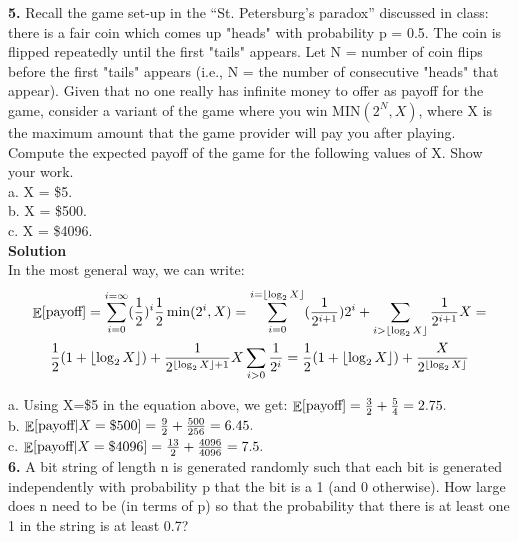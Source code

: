 \documentclass[10pt,a4paper,oneside,draft]{report}
\DeclareMathOperator{\EX}{\mathbb{E}}%
\DeclarePairedDelimiter\floor{\lfloor}{\rfloor}
\begin{document}
	
\textbf{5.} Recall the game set-up in the “St. Petersburg’s paradox” discussed in class: there is a fair coin which comes up "heads" with probability p = 0.5. The coin is flipped repeatedly until the first "tails" appears. Let N = number of coin flips before the first "tails" appears (i.e., N = the number of consecutive "heads" that appear). Given that no one really has infinite money to offer as payoff for the game, consider a variant of the game where you win MIN$(2^N , X)$,
where X is the maximum amount that the game provider will pay you after playing. Compute the expected payoff of the game for the following values of X. Show your work.\\
a. X = \$5. \\
b. X = \$500. \\
c. X = \$4096. \\

\textbf{Solution} \\

In the most general way, we can write: \\



\begin{gather*}
\EX[\textnormal{payoff}] = \sum_{i=0}^{i=\infty} (\frac{1}{2})^i \frac{1}{2} \min(2^i, X) = \sum_{i=0}^{i=\floor*{\log_2 X}} (\frac{1}{2^{i + 1}}) 2^i + \sum_{i>\floor*{\log_2 X}} \frac{1}{2^{i + 1}} X = \\
\frac{1}{2} (1 + \floor*{\log_2 X}) + \frac{1}{2^{ \floor*{\log_2 X} + 1 }} X \sum_{i>0} \frac{1}{2 ^ i} = \frac{1}{2} (1 + \floor*{\log_2 X}) + \frac{X}{2^{ \floor*{\log_2 X} }}
\end{gather*}

a. Using X=\$5 in the equation above, we get: $\EX[\textnormal{payoff}] = \frac{3}{2} + \frac{5}{4} = 2.75.$ \\

b. $\EX[\textnormal{payoff} | X=\$500] = \frac{9}{2} + \frac{500}{256} = 6.45.$ \\

c. $\EX[\textnormal{payoff} | X=\$4096] = \frac{13}{2} + \frac{4096}{4096} = 7.5.$\\

\textbf{6.} A bit string of length n is generated randomly such that each bit is generated independently
with probability p that the bit is a 1 (and 0 otherwise). How large does n need to be (in terms
of p) so that the probability that there is at least one 1 in the string is at least 0.7? \\
\end{document}
